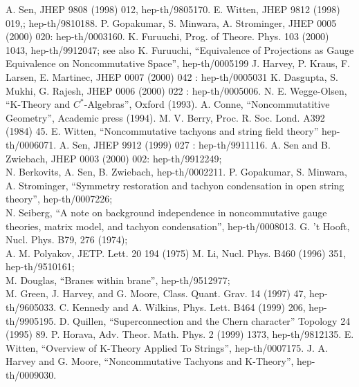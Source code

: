 \documentclass[a4paper,12pt]{article}
\begin{document}
\begin{thebibliography}{99}
 A. Sen, JHEP 9808 (1998) 012,
hep-th/9805170.
 E. Witten, JHEP 9812 (1998) 019,; hep-th/9810188.
  P. Gopakumar, S. Minwara, A. Strominger,
JHEP 0005 (2000) 020: hep-th/0003160.
 K. Furuuchi, Prog. of Theore. Phys. 103 (2000) 1043,
hep-th/9912047;
see also K. Furuuchi, 
``Equivalence of Projections as Gauge Equivalence on
Noncommutative Space'',
hep-th/0005199
  J. Harvey, P. Kraus, F. Larsen, E. Martinec, 
	JHEP 0007 (2000) 042 : hep-th/0005031 
 K. Dasgupta, S. Mukhi, G. Rajesh,
	JHEP 0006 (2000) 022 : hep-th/0005006.
 N. E. Wegge-Olsen, ``K-Theory
and $C^*$-Algebras'', Oxford (1993).
 A. Conne, ``Noncommutatitive Geometry'',
Academic press (1994).
 M. V. Berry, Proc. R. Soc. Lond. A392 (1984) 45.
 E. Witten, ``Noncommutative tachyons and string
field theory'' hep-th/0006071.
 A. Sen, JHEP 9912 (1999) 027 : hep-th/9911116.
 A. Sen and B. Zwiebach, JHEP 0003 (2000) 002:
	hep-th/9912249;\\
 N. Berkovits, A. Sen, B. Zwiebach, hep-th/0002211.
 P. Gopakumar, S. Minwara, A. Strominger,
``Symmetry restoration and tachyon condensation in open string theory'',
hep-th/0007226;\\
N. Seiberg, ``A note on background independence in
noncommutative gauge theories, matrix model, and tachyon condensation'',
hep-th/0008013.
 G. 't Hooft, Nucl. Phys. B79, 276 (1974);\\
A. M. Polyakov, JETP. Lett. 20 194 (1975)
 M. Li, Nucl. Phys. B460 (1996) 351,
hep-th/9510161;\\
M. Douglas, ``Branes within brane'', hep-th/9512977;\\
M. Green, J. Harvey, and G. Moore, Class. Quant. Grav.
14 (1997) 47, hep-th/9605033.
 C. Kennedy and A. Wilkins,
Phys. Lett. B464 (1999) 206, hep-th/9905195.
 D. Quillen, ``Superconnection and the
Chern character'' Topology 24 (1995) 89.
 P. Horava, Adv. Theor. Math. Phys. 2 (1999) 1373,
 hep-th/9812135.
 E. Witten, ``Overview of K-Theory
Applied To Strings'', hep-th/0007175.
 J. A. Harvey and G. Moore, 
``Noncommutative Tachyons and K-Theory'',
hep-th/0009030.
\end{thebibliography}
\end{document}
